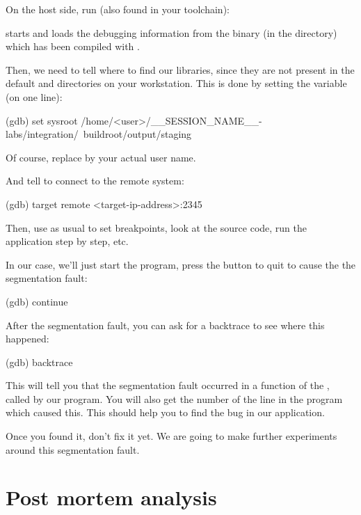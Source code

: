 
On the host side, run  (also found in your toolchain):

 starts and loads the debugging information from the
 binary (in the  directory)
which has been compiled with .

Then, we need to tell where to find our libraries, since they are not
present in the default  and  directories on
your workstation. This is done by setting the  
variable (on one line):

\begin{bashinput}
(gdb) set sysroot /home/<user>/__SESSION_NAME__-labs/integration/\
    buildroot/output/staging
\end{bashinput}

Of course, replace  by your actual user name.

And tell  to connect to the remote system:
\begin{bashinput}
(gdb) target remote <target-ip-address>:2345
\end{bashinput}

Then, use  as usual to set breakpoints, look at the source
code, run the application step by step, etc.

In our case, we'll just start the program, press the  button
to quit to cause the the segmentation fault:
\begin{bashinput}
(gdb) continue
\end{bashinput}

After the segmentation fault, you can ask for a backtrace to see
where this happened:
\begin{bashinput}
(gdb) backtrace
\end{bashinput}

This will tell you that the segmentation fault occurred in a function
of the \code{libmpdclient}, called by our program. You will also get
the number of the line in the program which caused this. This should
help you to find the bug in our application.

Once you found it, don't fix it yet. We are going to make further
experiments around this segmentation fault.

\section{Post mortem analysis}


